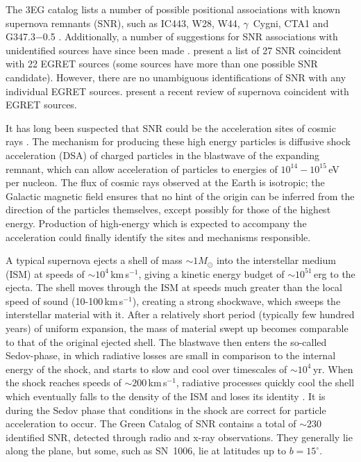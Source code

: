 The 3EG catalog lists a number of possible positional associations
with known supernova remnants (SNR), such as IC443, W28, W44,
$\gamma$~Cygni, CTA1 and G347.3$-$0.5
\citep{REF::ESPOSITO::APJ1996}. Additionally, a number of suggestions
for SNR associations with unidentified sources have since been made
\citep{REF::COMBI::AA2001, REF::ROBERTS::APJS2001}. 
\citet{REF::ROMERO::AA1999} present a list of 27 SNR coincident 
with 22 EGRET sources (some sources have more than one possible SNR
candidate). However, there are no unambiguous identifications of SNR
with any individual EGRET sources. \citet{REF::TORRES::PR2003} present
a recent review of supernova coincident with EGRET sources.

It has long been suspected that SNR could be the acceleration sites of
cosmic rays \citep{REF::GINZBURG::BOOK1964}. The mechanism for
producing these high energy particles is diffusive shock acceleration
(DSA) of charged particles in the blastwave of the expanding remnant,
which can allow acceleration of particles to energies of
$10^{14}-10^{15}$\,eV per nucleon. The flux of cosmic rays observed at
the Earth is isotropic; the Galactic magnetic field ensures that no
hint of the origin can be inferred from the direction of the particles
themselves, except possibly for those of the highest
energy. Production of high-energy \Grays which is expected to
accompany the acceleration could finally identify the sites and
mechanisms responsible.

A typical supernova ejects a shell of mass $\sim1M_\odot$ into the
interstellar medium (ISM) at speeds of $\sim10^4$\,km\,s$^{-1}$,
giving a kinetic energy budget of $\sim10^{51}$\,erg to the
ejecta. The shell moves through the ISM at speeds much greater than
the local speed of sound (10-100\,km\,s$^{-1}$), creating a strong
shockwave, which sweeps the interstellar material with it. After a
relatively short period (typically few hundred years) of uniform
expansion, the mass of material swept up becomes comparable to that of
the original ejected shell. The blastwave then enters the so-called
Sedov-phase, in which radiative losses are small in comparison to the
internal energy of the shock, and starts to slow and cool over
timescales of $\sim10^4$\,yr. When the shock reaches speeds of
$\sim200$\,km\,s$^{-1}$, radiative processes quickly cool the shell
which eventually falls to the density of the ISM and loses its
identity \citep{REF::WOLTJER::ARAA1972}. It is during the Sedov phase
that conditions in the shock are correct for particle acceleration to
occur. The Green Catalog of SNR \citep{REF::GREEN::WEB2001} contains a
total of $\sim230$ identified SNR, detected through radio and x-ray
observations. They generally lie along the plane, but some, such as
SN~1006, lie at latitudes up to $b=15^\circ$.

